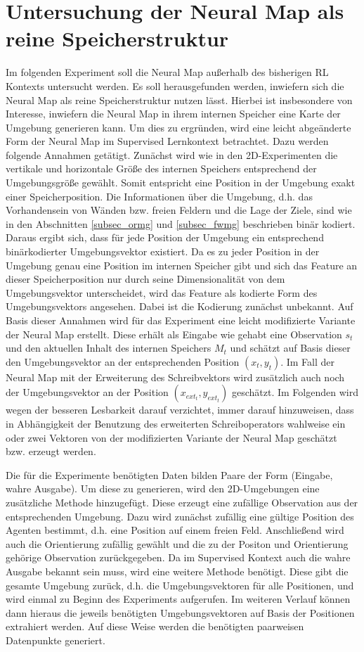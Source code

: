 \section{Untersuchung der Neural Map als reine Speicherstruktur}

Im folgenden Experiment soll die Neural Map außerhalb des bisherigen RL Kontexts untersucht werden. Es soll herausgefunden werden, inwiefern sich die Neural Map als reine Speicherstruktur nutzen lässt. Hierbei ist insbesondere von Interesse, inwiefern die Neural Map in ihrem internen Speicher eine Karte der Umgebung generieren kann. Um dies zu ergründen, wird eine leicht abgeänderte Form der Neural Map im Supervised Lernkontext betrachtet. Dazu werden folgende Annahmen getätigt. Zunächst wird wie in den 2D-Experimenten die vertikale und horizontale Größe des internen Speichers entsprechend der Umgebungsgröße gewählt. Somit entspricht eine Position in der Umgebung exakt einer Speicherposition. Die Informationen über die Umgebung, d.h. das Vorhandensein von Wänden bzw. freien Feldern und die Lage der Ziele, sind wie in den Abschnitten \ref{subsec_ormg} und \ref{subsec_fwmg} beschrieben binär kodiert. Daraus ergibt sich, dass für jede Position der Umgebung ein entsprechend binärkodierter Umgebungsvektor existiert. Da es zu jeder Position in der Umgebung genau eine Position im internen Speicher gibt und sich das Feature an dieser Speicherposition nur durch seine Dimensionalität von dem Umgebungsvektor unterscheidet, wird das Feature als kodierte Form des Umgebungsvektors angesehen. Dabei ist die Kodierung zunächst unbekannt. Auf Basis dieser Annahmen wird für das Experiment eine leicht modifizierte Variante der Neural Map erstellt. Diese erhält als Eingabe wie gehabt eine Observation $s_t$ und den aktuellen Inhalt des internen Speichers $M_t$ und schätzt auf Basis dieser den Umgebungsvektor an der entsprechenden Position $(x_t, y_t)$. Im Fall der Neural Map mit der Erweiterung des Schreibvektors wird zusätzlich auch noch der Umgebungsvektor an der Position $(x_{ext_t},y_{ext_t})$ geschätzt. Im Folgenden wird wegen der besseren Lesbarkeit darauf verzichtet, immer darauf hinzuweisen, dass in Abhängigkeit der Benutzung des erweiterten Schreiboperators wahlweise ein oder zwei Vektoren von der modifizierten Variante der Neural Map geschätzt bzw. erzeugt werden.

Die für die Experimente benötigten Daten bilden Paare der Form (Eingabe, wahre Ausgabe). Um diese zu generieren, wird den 2D-Umgebungen eine zusätzliche Methode hinzugefügt. Diese erzeugt eine zufällige Observation aus der entsprechenden Umgebung. Dazu wird zunächst zufällig eine gültige Position des Agenten bestimmt, d.h. eine Position auf einem freien Feld. Anschließend wird auch die Orientierung zufällig gewählt und die zu der Positon und Orientierung gehörige Observation zurückgegeben. Da im Supervised Kontext auch die wahre Ausgabe bekannt sein muss, wird eine weitere Methode benötigt. Diese gibt die gesamte Umgebung zurück, d.h. die Umgebungsvektoren für alle Positionen, und wird einmal zu Beginn des Experiments aufgerufen. Im weiteren Verlauf können dann hieraus die jeweils benötigten Umgebungsvektoren auf Basis der Positionen extrahiert werden. Auf diese Weise werden die benötigten paarweisen Datenpunkte generiert.

